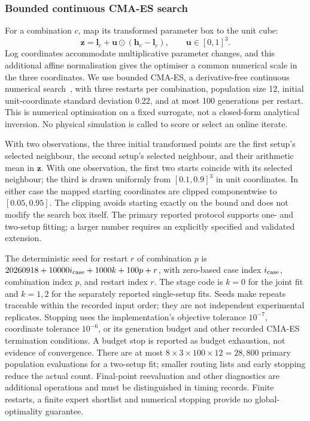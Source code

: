 \subsubsection{Bounded continuous CMA-ES search}
For a combination $c$, map its transformed parameter box to the unit cube:
\begin{equation}
\label{eq:inverse-unit-coordinates}
 \mathbf z=\mathbf l_c+
       \mathbf u\odot(\mathbf h_c-\mathbf l_c),\qquad
       \mathbf u\in[0,1]^3.
\end{equation}
Log coordinates accommodate multiplicative parameter changes, and this
additional affine normalisation gives the optimiser a common numerical
scale in the three coordinates. We use bounded CMA-ES, a derivative-free
continuous numerical search~\cite{hansen2016cma}, with three restarts per
combination, population size 12, initial unit-coordinate standard deviation
0.22, and at most 100 generations per restart. This is numerical
optimisation on a fixed surrogate, not a closed-form analytical inversion.
No physical simulation is called to score or select an online iterate.

With two observations, the three initial transformed points are the
first setup's selected neighbour, the second setup's selected neighbour,
and their arithmetic mean in $\mathbf z$. With one observation, the first
two starts coincide with its selected neighbour; the third is drawn
uniformly from $[0.1,0.9]^3$ in unit coordinates. In either case the
mapped starting coordinates are clipped componentwise to $[0.05,0.95]$.
The clipping avoids starting exactly on the bound and does not modify
the search box itself. The primary reported protocol supports one- and
two-setup fitting; a larger number requires an explicitly specified
and validated extension.

The deterministic seed for restart $r$ of combination $p$ is
$20260918+10000i_{\rm case}+1000k+100p+r$, with zero-based case index $i_{\rm case}$,
combination index $p$, and restart index $r$. The stage code is $k=0$
for the joint fit and $k=1,2$ for the separately reported single-setup
fits. Seeds make repeats traceable within the recorded input order;
they are not independent experimental replicates.
Stopping uses the implementation's objective tolerance $10^{-7}$,
coordinate tolerance $10^{-6}$, or its generation budget and other
recorded CMA-ES termination conditions. A budget stop is reported as
budget exhaustion, not evidence of convergence. There are at most
$8\times3\times100\times12=28{,}800$ primary population evaluations
for a two-setup fit; smaller routing lists and early stopping reduce
the actual count. Final-point reevaluation and other diagnostics are
additional operations and must be distinguished in timing records.
Finite restarts, a finite expert shortlist and numerical stopping
provide no global-optimality guarantee.

